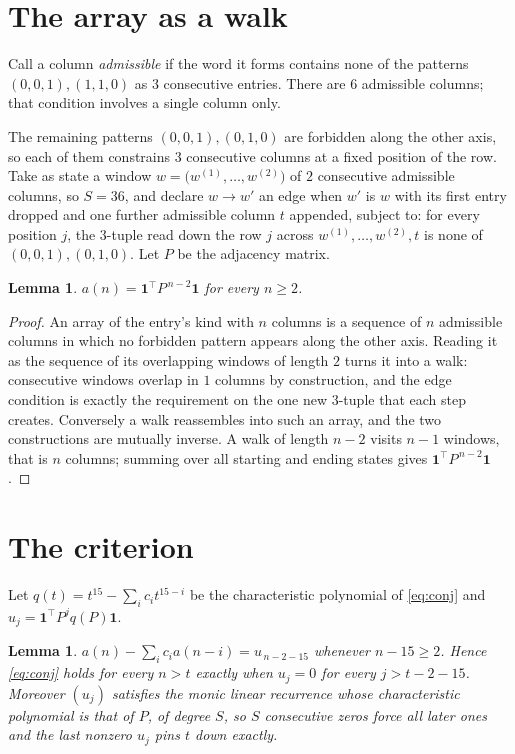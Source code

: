 \documentclass[11pt,a4paper]{article}
\theoremstyle{plain}
\newtheorem{lemma}[theorem]{Lemma}
\theoremstyle{definition}
\begin{document}
\section{The array as a walk}

Call a column \emph{admissible} if the word it forms contains none of the patterns
$(0,0,1), (1,1,0)$ as $3$ consecutive entries. There are $6$ admissible columns; that condition
involves a single column only.

The remaining patterns $(0,0,1), (0,1,0)$ are forbidden along the other axis, so each of them
constrains $3$ consecutive columns at a fixed position of the row. Take as state a
window $w=\bigl(w^{(1)},\dots,w^{(2)}\bigr)$ of $2$ consecutive admissible
columns, so $S=36$, and declare $w\to w'$ an edge when $w'$ is $w$ with its first entry
dropped and one further admissible column $t$ appended, subject to: for every position
$j$, the $3$-tuple read down the row $j$ across $w^{(1)},\dots,w^{(2)},t$
is none of $(0,0,1), (0,1,0)$. Let $P$ be the adjacency matrix.

\begin{lemma}\label{lem:walk}
$a(n)=\mathbf{1}^{\!\top}P^{\,n-2}\mathbf{1}$ for every $n\ge2$.
\end{lemma}

\begin{proof}
An array of the entry's kind with $n$ columns is a sequence of $n$ admissible columns in
which no forbidden pattern appears along the other axis. Reading it as the sequence of its
overlapping windows of length $2$ turns it into a walk: consecutive windows overlap in
$1$ columns by construction, and the edge condition is exactly the requirement on the one
new $3$-tuple that each step creates. Conversely a walk reassembles into such an array,
and the two constructions are mutually inverse. A walk of length $n-2$ visits $n-1$
windows, that is $n$ columns; summing over all starting and ending states gives
$\mathbf{1}^{\!\top}P^{\,n-2}\mathbf{1}$.
\end{proof}

\section{The criterion}

Let $q(t)=t^{15}-\sum_i c_i t^{15-i}$ be the characteristic polynomial of
\eqref{eq:conj} and $u_j=\mathbf{1}^{\!\top}P^{j}q(P)\mathbf{1}$.

\begin{lemma}\label{lem:crit}
$a(n)-\sum_i c_i a(n-i)=u_{\,n-2-15}$ whenever $n-15\ge2$. Hence
\eqref{eq:conj} holds for every $n>t$ exactly when $u_j=0$ for every
$j>t-2-15$. Moreover $(u_j)$ satisfies the monic linear recurrence whose
characteristic polynomial is that of $P$, of degree $S$, so $S$ consecutive zeros force all
later ones and the last nonzero $u_j$ pins $t$ down exactly.
\end{lemma}
\end{document}

